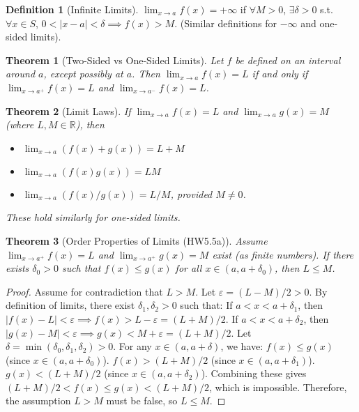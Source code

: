 \documentclass{article}
\theoremstyle{definition}
\newtheorem{definition}{Definition}[section]
\theoremstyle{plain}
\newtheorem{theorem}{Theorem}[section]
\theoremstyle{remark}
\newcommand{\R}{\mathbb{R}}
\newcommand{\eps}{\varepsilon}
\begin{document}
\begin{definition}[Infinite Limits{\cite[Sec 20]{Ross}}]
\(\lim_{x\to a} f(x) = +\infty\) if \(\forall M > 0\), \(\exists \delta > 0\) s.t. \(\forall x \in S\), \( 0 < |x-a| < \delta \implies f(x) > M \). (Similar definitions for \(-\infty\) and one-sided limits).
\end{definition}

\begin{theorem}[Two-Sided vs One-Sided Limits{\cite[Thm 20.10]{Ross}}]
Let \(f\) be defined on an interval around \(a\), except possibly at \(a\). Then \(\lim_{x\to a} f(x) = L\) if and only if \(\lim_{x\to a^+} f(x) = L\) and \(\lim_{x\to a^-} f(x) = L\).
\end{theorem}

\begin{theorem}[Limit Laws{\cite[Thm 20.4]{Ross}}]
If \(\lim_{x\to a} f(x) = L\) and \(\lim_{x\to a} g(x) = M\) (where \(L, M \in \R\)), then
\begin{itemize}
    \item \(\lim_{x\to a} (f(x)+g(x)) = L+M\)
    \item \(\lim_{x\to a} (f(x)g(x)) = LM\)
    \item \(\lim_{x\to a} (f(x)/g(x)) = L/M\), provided \(M\ne 0\).
\end{itemize}
These hold similarly for one-sided limits.
\end{theorem}

\begin{theorem}[Order Properties of Limits{\cite[Thm 20.5]{Ross}} (HW5.5a)]
Assume \(\lim_{x\to a^+} f(x) = L\) and \(\lim_{x\to a^+} g(x) = M\) exist (as finite numbers).
If there exists \(\delta_0 > 0\) such that \(f(x) \le g(x)\) for all \(x \in (a, a+\delta_0)\), then \(L \le M\).
\end{theorem}
\begin{proof}
Assume for contradiction that \(L > M\). Let \(\eps = (L-M)/2 > 0\).
By definition of limits, there exist \(\delta_1, \delta_2 > 0\) such that:
If \(a < x < a+\delta_1\), then \(|f(x) - L| < \eps \implies f(x) > L - \eps = (L+M)/2\).
If \(a < x < a+\delta_2\), then \(|g(x) - M| < \eps \implies g(x) < M + \eps = (L+M)/2\).
Let \(\delta = \min(\delta_0, \delta_1, \delta_2) > 0\). For any \(x \in (a, a+\delta)\), we have:
\(f(x) \le g(x)\) (since \(x \in (a, a+\delta_0)\)).
\(f(x) > (L+M)/2\) (since \(x \in (a, a+\delta_1)\)).
\(g(x) < (L+M)/2\) (since \(x \in (a, a+\delta_2)\)).
Combining these gives \((L+M)/2 < f(x) \le g(x) < (L+M)/2\), which is impossible.
Therefore, the assumption \(L > M\) must be false, so \(L \le M\).
\end{proof}
\end{document}
